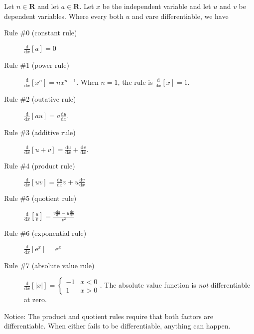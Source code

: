 \documentclass[12pt,fleqn,answers]{exam}
\newcommand{\reals}{\mathbf{R}}
\begin{document}
\large




\noindent Let $n \in \reals$ and let $a \in \reals$. Let $x$ be the independent variable and let $u$ and $v$ be dependent variables. Where every both $u$ and $v$are differentiable, we have
\begin{description}

\item[Rule \#0 (constant rule)]  \( \frac{\mathrm{d}}{\mathrm{d} x} \left [a \right] = 0 \)
\item[Rule \#1 (power rule)]  \( \frac{\mathrm{d}}{\mathrm{d} x} \left [x^n \right] = n x^{n-1}\).  When $n=1$, the rule
is \( \frac{\mathrm{d}}{\mathrm{d} x} \left [x \right] = 1 \).
\item[Rule \#2 (outative rule)]  \( \frac{\mathrm{d}}{\mathrm{d} x} \left [a u \right] = a \frac{\mathrm{d} u}{\mathrm{d} x}\).
\item[Rule \#3 (additive rule)]  \( \frac{\mathrm{d}}{\mathrm{d} x} \left [ u + v \right] =  \frac{\mathrm{d} u}{\mathrm{d} x}
+   \frac{\mathrm{d} v}{\mathrm{d} x}\).
\item[Rule \#4 (product  rule)]  \( \frac{\mathrm{d}}{\mathrm{d} x} \left [ u v \right] = \frac{\mathrm{d} u}{\mathrm{d} x} v
+ u \frac{\mathrm{d} v}{\mathrm{d} x}\)
\item[Rule \#5 (quotient  rule)]  \( \frac{\mathrm{d}}{\mathrm{d} x} \left [\frac{u}{v} \right] = 
\frac{v \frac{\mathrm{d} u}{\mathrm{d} x} - u \frac{\mathrm{d} v}{\mathrm{d} x}}{v^2}\)

\item[Rule \#6 (exponential  rule)] \( \frac{\mathrm{d}}{\mathrm{d} x} \left [\mathrm{e}^x \right] = \mathrm{e}^x \)

 \item[Rule \#7 (absolute value rule)] \( \frac{\mathrm{d}}{\mathrm{d} x} \left[|x| \right] = 
 \begin{cases} -1 & x < 0 \\   1 & x > 0 \end{cases}\). The absolute value function is \emph{not} differentiable at zero.


\end{description}

\noindent Notice: The product and quotient rules require  that both factors are differentiable. When either fails to be differentiable, anything can happen.
\end{document}
